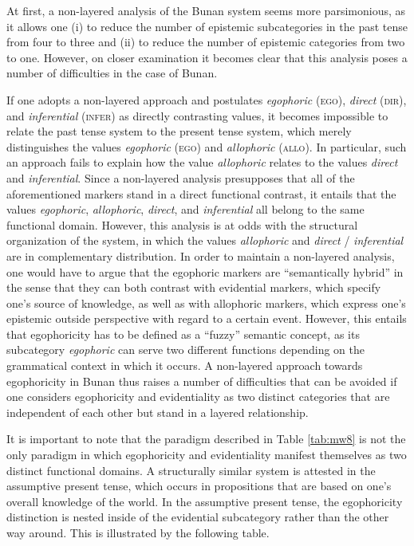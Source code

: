 \documentclass[output=paper]{langsci/langscibook}
\begin{document}
At first, a non-layered analysis of the Bunan system seems more parsimonious, as it allows one (i) to reduce the number of epistemic subcategories in the past tense from four to three and (ii) to reduce the number of epistemic categories from two to one. However, on closer examination it becomes clear that this analysis poses a number of difficulties in the case of Bunan.

If one adopts a non-layered approach and postulates \emph{egophoric} (\textsc{ego}), \emph{direct} (\textsc{dir}), and \emph{inferential} (\textsc{infer}) as directly contrasting values, it becomes impossible to relate the past tense system to the present tense system, which merely distinguishes the values \emph{egophoric} (\textsc{ego}) and \emph{allophoric} (\textsc{allo}). In particular, such an approach fails to explain how the value \textit{allophoric} relates to the values \textit{direct} and \textit{inferential}. Since a non-layered analysis presupposes that all of the aforementioned markers stand in a direct functional contrast, it entails that the values \textit{egophoric}, \textit{allophoric}, \textit{direct}, and \textit{inferential} all belong to the same functional domain. However, this analysis is at odds with the structural organization of the system, in which the values \textit{allophoric} and \textit{direct} / \textit{inferential} are in complementary distribution. In order to maintain a non-layered analysis, one would have to argue that the egophoric markers are “semantically hybrid” in the sense that they can both contrast with evidential markers, which specify one’s source of knowledge, as well as with allophoric markers, which express one’s epistemic outside perspective with regard to a certain event. However, this entails that egophoricity has to be defined as a “fuzzy” semantic concept, as its subcategory \textit{egophoric} can serve two different functions depending on the grammatical context in which it occurs. A non-layered approach towards egophoricity in Bunan thus raises a number of difficulties that can be avoided if one considers egophoricity and evidentiality as two distinct categories that are independent of each other but stand in a layered relationship.

It is important to note that the paradigm described in Table \ref{tab:mw8} is not the only paradigm in which egophoricity and evidentiality manifest themselves as two distinct functional domains. A structurally similar system is attested in the assumptive present tense, which occurs in propositions that are based on one’s overall knowledge of the world. In the assumptive present tense, the egophoricity distinction is nested inside of the evidential subcategory rather than the other way around. This is illustrated by the following table.
\end{document}
